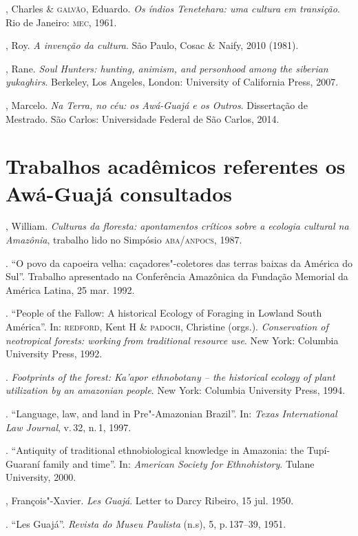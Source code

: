 \begin{bibliohedra}
, Charles \& \textsc{galvão}, Eduardo. \emph{Os índios Tenetehara: uma cultura em transição}. Rio de Janeiro: \textsc{mec}, 1961.

, Roy. \emph{A invenção da cultura}. São Paulo, Cosac \& Naify, 2010 (1981).

, Rane. \emph{Soul Hunters: hunting, animism, and personhood
among the siberian yukaghirs}. Berkeley, Los Angeles, London: University
of California Press, 2007.

, Marcelo. \emph{Na Terra, no céu: os Awá-Guajá e os Outros}.
Dissertação de Mestrado. São Carlos: Universidade Federal de São Carlos, 2014.

\section{Trabalhos acadêmicos referentes os Awá-Guajá consultados}

, William. \emph{Culturas da floresta: apontamentos críticos
sobre a ecologia cultural na Amazônia}, trabalho lido no Simpósio
\textsc{aba}/\textsc{anpocs}, 1987.

\titidem. ``O povo da capoeira velha: caçadores"-coletores
das terras baixas da América do Sul''. Trabalho apresentado na
Conferência Amazônica da Fundação Memorial da América Latina, 25 mar. 1992.

\titidem. ``People of the Fallow: A historical Ecology of
Foraging in Lowland South América''. In: \textsc{redford}, Kent H \& \textsc{padoch}, Christine (orgs.). \emph{Conservation of neotropical forests: working from
traditional resource use}. New York: Columbia University Press, 1992.

\titidem. \emph{Footprints of the forest: Ka'apor
ethnobotany -- the historical ecology of plant utilization by an
amazonian people}. New York: Columbia University Press, 1994.

\titidem. ``Language, law, and land in Pre"-Amazonian
Brazil''. In: \emph{Texas International Law Journal}, v.\,32, n.\,1, 1997.

\titidem. ``Antiquity of traditional ethnobiological
knowledge in Amazonia: the Tupí-Guaraní family and time''. In:
\emph{American Society for Ethnohistory}. Tulane University, 2000.

, François"-Xavier. \emph{Les Guajá}. Letter to Darcy
Ribeiro, 15 jul. 1950.

\titidem. ``Les Guajá''. \emph{Revista do Museu Paulista} (n.s), 5, p.\,137--39, 1951.


\end{bibliohedra}
